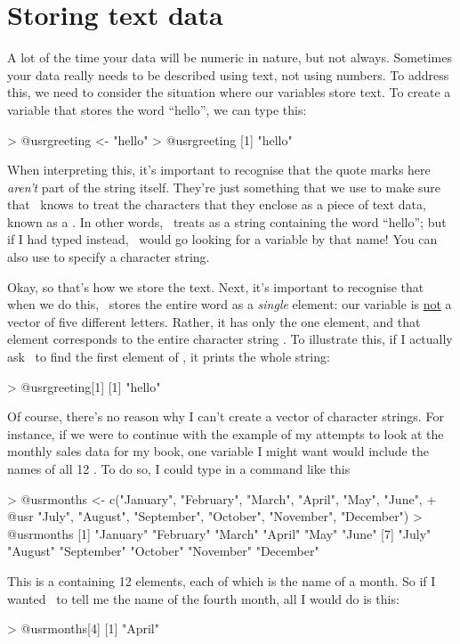 \section{Storing text data\label{sec:text}}

A lot of the time your data will be numeric in nature, but not always. Sometimes your data really needs to be described using text, not using numbers. To address this, we need to consider the situation where our variables store text. To create a variable that stores the word ``hello'', we can type this:
\begin{rblock1}
> @usr{greeting <- "hello"}
> @usr{greeting}
[1] "hello"
\end{rblock1}
When interpreting this, it's important to recognise that the quote marks here {\it aren't} part of the string itself. They're just something that we use to make sure that \R\ knows to treat the characters that they enclose as a piece of text data, known as a . In other words, \R\ treats  as a string containing the word ``hello''; but if I had typed  instead, \R\ would go looking for a variable by that name! You can also use  to specify a character string.

Okay, so that's how we store the text. Next, it's important to recognise that when we do this, \R\ stores the entire word  as a {\it single} element: our  variable is \underline{not} a vector of five different letters. Rather, it has only the one element, and that element corresponds to the entire character string . To illustrate this, if I actually ask \R\ to find the first element of , it prints the whole string:
\begin{rblock1}
> @usr{greeting[1]}
[1] "hello"
\end{rblock1}
Of course, there's no reason why I can't create a vector of character strings. For instance, if we were to continue with the example of my attempts to look at the monthly sales data for my book, one variable I might want would include the names of all 12 . To do so, I could type in a command like this
\begin{rblock1}
> @usr{months <- c("January", "February", "March", "April", "May", "June",}
+ @usr{            "July", "August", "September", "October", "November", "December")}
> @usr{months}
 [1] "January"   "February"  "March"     "April"     "May"       "June"     
 [7] "July"      "August"    "September" "October"   "November"  "December" 
\end{rblock1}
This is a  containing 12 elements, each of which is the name of a month. So if I wanted \R\ to tell me the name of the fourth month, all I would do is this:
\begin{rblock1}
> @usr{months[4]}
[1] "April"
\end{rblock1}



